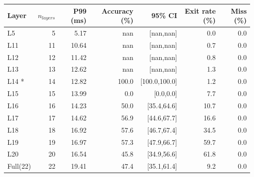 \begin{tabular}{lrrrrrr}
\toprule
Layer & $n_{layers}$ & P99 (ms) & Accuracy (\%) & 95\% CI & Exit rate (\%) & Miss (\%) \\
\midrule
L5 & 5 & 5.17 & nan & [nan,nan] & 0.0 & 0.0 \\
L11 & 11 & 10.64 & nan & [nan,nan] & 0.7 & 0.0 \\
L12 & 12 & 11.42 & nan & [nan,nan] & 0.8 & 0.0 \\
L13 & 13 & 12.62 & nan & [nan,nan] & 1.3 & 0.0 \\
L14 * & 14 & 12.82 & 100.0 & [100.0,100.0] & 1.2 & 0.0 \\
L15 & 15 & 13.99 & 0.0 & [0.0,0.0] & 7.7 & 0.0 \\
L16 & 16 & 14.23 & 50.0 & [35.4,64.6] & 10.7 & 0.0 \\
L17 & 17 & 14.62 & 56.9 & [44.6,67.7] & 16.6 & 0.0 \\
L18 & 18 & 16.92 & 57.6 & [46.7,67.4] & 34.5 & 0.0 \\
L19 & 19 & 16.97 & 57.3 & [47.9,66.7] & 59.7 & 0.0 \\
L20 & 20 & 16.54 & 45.8 & [34.9,56.6] & 61.8 & 0.0 \\
Full(22) & 22 & 19.41 & 47.4 & [35.1,61.4] & 9.2 & 0.0 \\
\bottomrule
\end{tabular}

